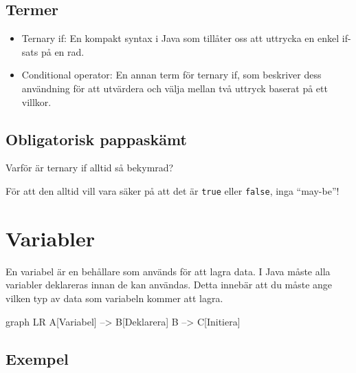 \hypertarget{termer}{%
\subsection{Termer}\label{termer}}

\begin{itemize}
\tightlist
\item
  Ternary if: En kompakt syntax i Java som tillåter oss att uttrycka en
  enkel if-sats på en rad.
\item
  Conditional operator: En annan term för ternary if, som beskriver dess
  användning för att utvärdera och välja mellan två uttryck baserat på
  ett villkor.
\end{itemize}

\hypertarget{obligatorisk-pappaskuxe4mt}{%
\subsection{Obligatorisk pappaskämt}\label{obligatorisk-pappaskuxe4mt}}

Varför är ternary if alltid så bekymrad?

För att den alltid vill vara säker på att det är \texttt{true} eller
\texttt{false}, inga ``may-be''!

\hypertarget{variabler}{%
\section{Variabler}\label{variabler}}

En variabel är en behållare som används för att lagra data. I Java måste
alla variabler deklareras innan de kan användas. Detta innebär att du
måste ange vilken typ av data som variabeln kommer att lagra.

graph LR A{[}Variabel{]} --\textgreater{} B{[}Deklarera{]} B
--\textgreater{} C{[}Initiera{]}

\hypertarget{exempel}{%
\subsection{Exempel}\label{exempel}}

